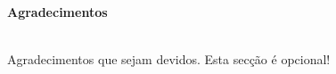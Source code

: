 \label{Agradecimentos}
{\large{\textbf{Agradecimentos}}}
\\
\\
\par
\begin{minipage}{\linewidth}
	Agradecimentos que sejam devidos. Esta secção é opcional!
	\\
\end {minipage}


